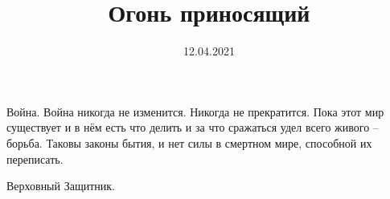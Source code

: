 \documentclass[a4paper, 12pt]{report}
\begin{document}
\title{Огонь приносящий}
\date{12.04.2021}
\maketitle


Война. Война никогда не изменится.
Никогда не прекратится.
Пока этот мир существует и в нём есть что делить и за что сражаться удел всего живого – борьба.
Таковы законы бытия, и нет силы в смертном мире, способной их переписать.

Верховный Защитник.
\end{document}
